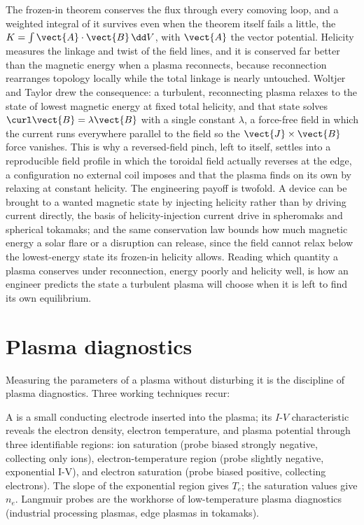 \begin{mastery}
The frozen-in theorem conserves the flux through every comoving loop, and a
weighted integral of it survives even when the theorem itself fails a little,
the  $K = \int\vect{A}\cdot\vect{B}\,\dd V$, with
$\vect{A}$ the vector potential. Helicity measures the linkage and twist of the
field lines, and it is conserved far better than the magnetic energy when a
plasma reconnects, because reconnection rearranges topology locally while the
total linkage is nearly untouched. Woltjer and Taylor drew the consequence: a
turbulent, reconnecting plasma relaxes to the state of lowest magnetic energy
at fixed total helicity, and that state solves $\curl\vect{B} = \lambda\vect{B}$
with a single constant $\lambda$, a force-free field in which the current runs
everywhere parallel to the field so the $\vect{J}\times\vect{B}$ force vanishes.
This  is why a reversed-field pinch, left to itself,
settles into a reproducible field profile in which the toroidal field actually
reverses at the edge, a configuration no external coil imposes and that the
plasma finds on its own by relaxing at constant helicity. The engineering
payoff is twofold. A device can be brought to a wanted magnetic state by
injecting helicity rather than by driving current directly, the basis of
helicity-injection current drive in spheromaks and spherical tokamaks; and the
same conservation law bounds how much magnetic energy a solar flare or a
disruption can release, since the field cannot relax below the lowest-energy
state its frozen-in helicity allows. Reading which quantity a plasma conserves
under reconnection, energy poorly and helicity well, is how an engineer
predicts the state a turbulent plasma will choose when it is left to find its
own equilibrium.
\end{mastery}

\section{Plasma diagnostics}

Measuring the parameters of a plasma without disturbing it is the
discipline of plasma diagnostics. Three working techniques recur:

A  is a small conducting electrode inserted
into the plasma; its $I$-$V$ characteristic reveals the electron
density, electron temperature, and plasma potential through three
identifiable regions: ion saturation (probe biased strongly negative,
collecting only ions), electron-temperature region (probe slightly
negative, exponential I-V), and electron saturation (probe biased
positive, collecting electrons). The slope of the exponential region
gives $T_{e}$; the saturation values give $n_{e}$. Langmuir probes
are the workhorse of low-temperature plasma diagnostics (industrial
processing plasmas, edge plasmas in tokamaks).

